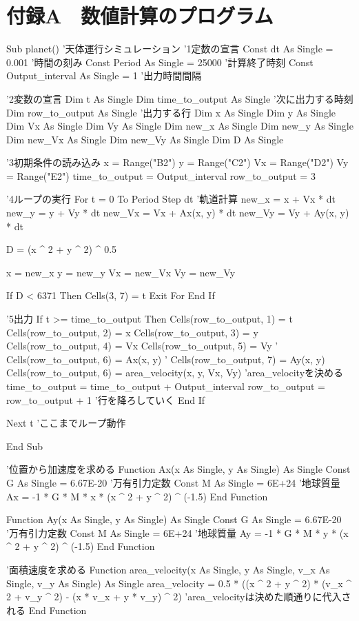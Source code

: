 \documentclass[11pt,b5paper,papersize,dvipdfmx]{jsbook}
\begin{document}
\section*{付録A　数値計算のプログラム}
\begin{sjcode}
    Sub planet() '天体運行シミュレーション
'1定数の宣言
    Const dt As Single = 0.001 '時間の刻み
    Const Period As Single = 25000 '計算終了時刻
    Const Output_interval As Single = 1 '出力時間間隔
    
'2変数の宣言
    Dim t As Single
    Dim time_to_output As Single '次に出力する時刻
    Dim row_to_output As Single '出力する行
    Dim x As Single
    Dim y As Single
    Dim Vx As Single
    Dim Vy As Single
    Dim new_x As Single
    Dim new_y As Single
    Dim new_Vx As Single
    Dim new_Vy As Single
    Dim D As Single
    
'3初期条件の読み込み
    x = Range("B2")
    y = Range("C2")
    Vx = Range("D2")
    Vy = Range("E2")
    time_to_output = Output_interval
    row_to_output = 3

'4ループの実行
    For t = 0 To Period Step dt '軌道計算
        new_x = x + Vx * dt
        new_y = y + Vy * dt
        new_Vx = Vx + Ax(x, y) * dt
        new_Vy = Vy + Ay(x, y) * dt
        
        D = (x ^ 2 + y ^ 2) ^ 0.5
        
        x = new_x
        y = new_y
        Vx = new_Vx
        Vy = new_Vy
        
    If D < 6371 Then
        Cells(3, 7) = t
        Exit For
    End If
    
'5出力
    If t >= time_to_output Then
        Cells(row_to_output, 1) = t
        Cells(row_to_output, 2) = x
        Cells(row_to_output, 3) = y
        Cells(row_to_output, 4) = Vx
        Cells(row_to_output, 5) = Vy
'        Cells(row_to_output, 6) = Ax(x, y)
'        Cells(row_to_output, 7) = Ay(x, y)
        Cells(row_to_output, 6) = area_velocity(x, y, Vx, Vy) 'area_velocityを決める
        time_to_output = time_to_output + Output_interval
        row_to_output = row_to_output + 1 '行を降ろしていく
    End If
    
    Next t 'ここまでループ動作
        
End Sub

'位置から加速度を求める
    Function Ax(x As Single, y As Single) As Single
    Const G As Single = 6.67E-20 '万有引力定数
    Const M As Single = 6E+24 '地球質量
        Ax = -1 * G * M * x * (x ^ 2 + y ^ 2) ^ (-1.5)
    End Function

    Function Ay(x As Single, y As Single) As Single
    Const G As Single = 6.67E-20 '万有引力定数
    Const M As Single = 6E+24 '地球質量
        Ay = -1 * G * M * y * (x ^ 2 + y ^ 2) ^ (-1.5)
    End Function

'面積速度を求める
    Function area_velocity(x As Single, y As Single, v_x As Single, v_y As Single) As Single
       area_velocity = 0.5 * ((x ^ 2 + y ^ 2) * (v_x ^ 2 + v_y ^ 2) - (x * v_x + y * v_y) ^ 2)
    'area_velocityは決めた順通りに代入される
    End Function
\end{sjcode}
\end{document}
